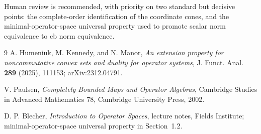 \documentclass[11pt]{article}
\theoremstyle{definition}
\begin{document}
Human review is recommended, with priority on two standard but decisive
points: the complete-order identification of the coordinate cones, and the
minimal-operator-space universal property used to promote scalar norm
equivalence to cb norm equivalence.

\begin{thebibliography}{9}
A. Humeniuk, M. Kennedy, and N. Manor,
\emph{An extension property for noncommutative convex sets and duality for
operator systems}, J. Funct. Anal. \textbf{289} (2025), 111153;
arXiv:2312.04791.

V. Paulsen,
\emph{Completely Bounded Maps and Operator Algebras},
Cambridge Studies in Advanced Mathematics 78, Cambridge University Press,
2002.

D. P. Blecher,
\emph{Introduction to Operator Spaces}, lecture notes, Fields Institute;
minimal-operator-space universal property in Section~1.2.
\end{thebibliography}
\end{document}
